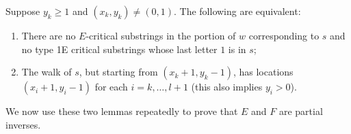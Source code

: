 \documentclass[ALCO,ThmDefs,Unicode,epreuves]{cedram}
\begin{document}
\begin{lemma} \label{lem:shifting-walks-E}
Suppose $y_k\ge 1$ and $(x_k,y_k)\neq (0,1)$. The following are equivalent:
\begin{enumerate}[label={(\roman*)}]
\item %
There are no $E$-critical substrings in the portion of $w$ corresponding to $s$ and no type 1E critical substrings whose last letter $1$ is in $s$;
\item %
The walk of $s$, but starting from $(x_k+1,y_k-1)$, has locations $(x_i+1,y_i-1)$ for each $i = k, \ldots, l+1$ \textup{(}this also implies $y_i > 0$\textup{)}.
\end{enumerate}
\end{lemma}

We now use these two lemmas repeatedly to prove that $E$ and $F$ are partial inverses.
\end{document}
